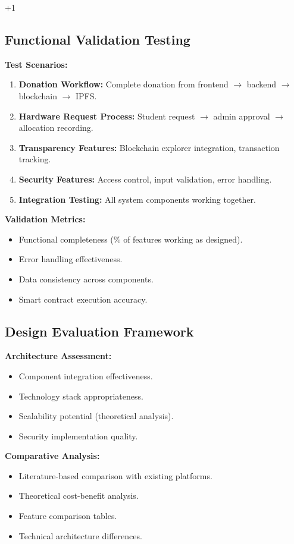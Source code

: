 +1\documentclass[conference]{IEEEtran}
\begin{document}
\subsection{Functional Validation Testing}
\textbf{Test Scenarios:}
\begin{enumerate}
    \item \textbf{Donation Workflow:} Complete donation from frontend \(\rightarrow\) backend \(\rightarrow\) blockchain \(\rightarrow\) IPFS.
    \item \textbf{Hardware Request Process:} Student request \(\rightarrow\) admin approval \(\rightarrow\) allocation recording.
    \item \textbf{Transparency Features:} Blockchain explorer integration, transaction tracking.
    \item \textbf{Security Features:} Access control, input validation, error handling.
    \item \textbf{Integration Testing:} All system components working together.
\end{enumerate}

\textbf{Validation Metrics:}
\begin{itemize}
    \item Functional completeness (\% of features working as designed).
    \item Error handling effectiveness.
    \item Data consistency across components.
    \item Smart contract execution accuracy.
\end{itemize}

\subsection{Design Evaluation Framework}
\textbf{Architecture Assessment:}
\begin{itemize}
    \item Component integration effectiveness.
    \item Technology stack appropriateness.
    \item Scalability potential (theoretical analysis).
    \item Security implementation quality.
\end{itemize}

\textbf{Comparative Analysis:}
\begin{itemize}
    \item Literature-based comparison with existing platforms.
    \item Theoretical cost-benefit analysis.
    \item Feature comparison tables.
    \item Technical architecture differences.
\end{itemize}
\end{document}

